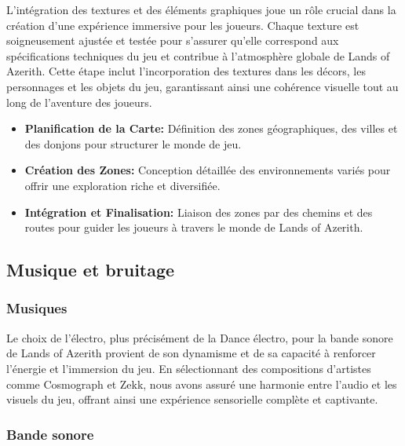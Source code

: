 L'intégration des textures et des éléments graphiques joue un rôle crucial dans la création d'une expérience immersive pour les joueurs. Chaque texture est soigneusement ajustée et testée pour s'assurer qu'elle correspond aux spécifications techniques du jeu et contribue à l'atmosphère globale de Lands of Azerith. Cette étape inclut l'incorporation des textures dans les décors, les personnages et les objets du jeu, garantissant ainsi une cohérence visuelle tout au long de l'aventure des joueurs.
\\

\begin{itemize}

    \item \textbf{Planification de la Carte:} Définition des zones géographiques, des villes et des donjons pour structurer le monde de jeu.
          \\

    \item \textbf{Création des Zones:} Conception détaillée des environnements variés pour offrir une exploration riche et diversifiée.
          \\

    \item \textbf{Intégration et Finalisation:} Liaison des zones par des chemins et des routes pour guider les joueurs à travers le monde de Lands of Azerith.
          \\

\end{itemize}

\subsection{Musique et bruitage}

\subsubsection{Musiques}

Le choix de l'électro, plus précisément de la Dance électro, pour la bande sonore de Lands of Azerith provient de son dynamisme et de sa capacité à renforcer l'énergie et l'immersion du jeu.
En sélectionnant des compositions d'artistes comme Cosmograph et Zekk, nous avons assuré une harmonie entre l'audio et les visuels du jeu, offrant ainsi une expérience sensorielle complète et captivante.

\subsubsection{Bande sonore}

